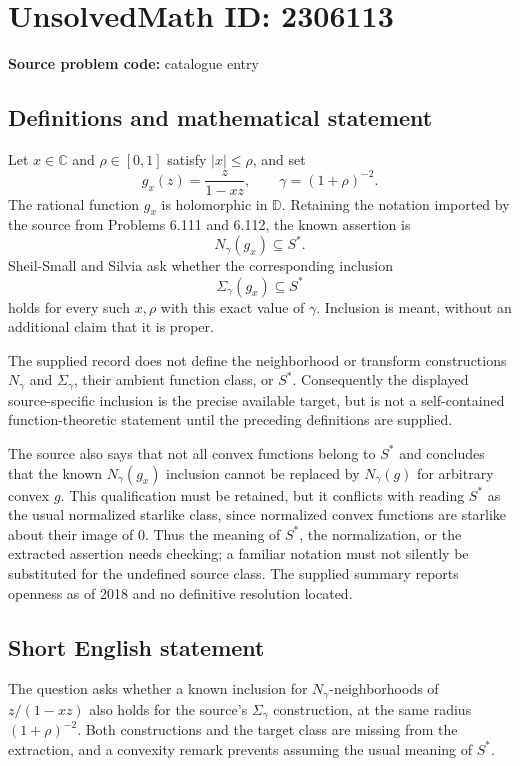 \documentclass[11pt]{article}
\newcommand{\C}{\mathbb{C}}
\begin{document}
\section*{UnsolvedMath ID: 2306113}
\textbf{Source problem code:} catalogue entry
\subsection{Definitions and mathematical statement}
Let $x\in\C$ and $\rho\in[0,1]$ satisfy $|x|\leq\rho$, and set
\[
g_x(z)=\frac{z}{1-xz},\qquad
\gamma=(1+\rho)^{-2}.
\]
The rational function $g_x$ is holomorphic in $\mathbb D$. Retaining the notation imported by the source from Problems 6.111 and 6.112, the known assertion is
\[
N_\gamma(g_x)\subseteq S^*.
\]
Sheil-Small and Silvia ask whether the corresponding inclusion
\[
\Sigma_\gamma(g_x)\subseteq S^*
\]
holds for every such $x,\rho$ with this exact value of $\gamma$. Inclusion is meant, without an additional claim that it is proper.

The supplied record does not define the neighborhood or transform constructions $N_\gamma$ and $\Sigma_\gamma$, their ambient function class, or $S^*$. Consequently the displayed source-specific inclusion is the precise available target, but is not a self-contained function-theoretic statement until the preceding definitions are supplied.

The source also says that not all convex functions belong to $S^*$ and concludes that the known $N_\gamma(g_x)$ inclusion cannot be replaced by $N_\gamma(g)$ for arbitrary convex $g$. This qualification must be retained, but it conflicts with reading $S^*$ as the usual normalized starlike class, since normalized convex functions are starlike about their image of $0$. Thus the meaning of $S^*$, the normalization, or the extracted assertion needs checking; a familiar notation must not silently be substituted for the undefined source class. The supplied summary reports openness as of 2018 and no definitive resolution located.
\subsection{Short English statement}
The question asks whether a known inclusion for $N_\gamma$-neighborhoods of $z/(1-xz)$ also holds for the source's $\Sigma_\gamma$ construction, at the same radius $(1+\rho)^{-2}$. Both constructions and the target class are missing from the extraction, and a convexity remark prevents assuming the usual meaning of $S^*$.
\end{document}
